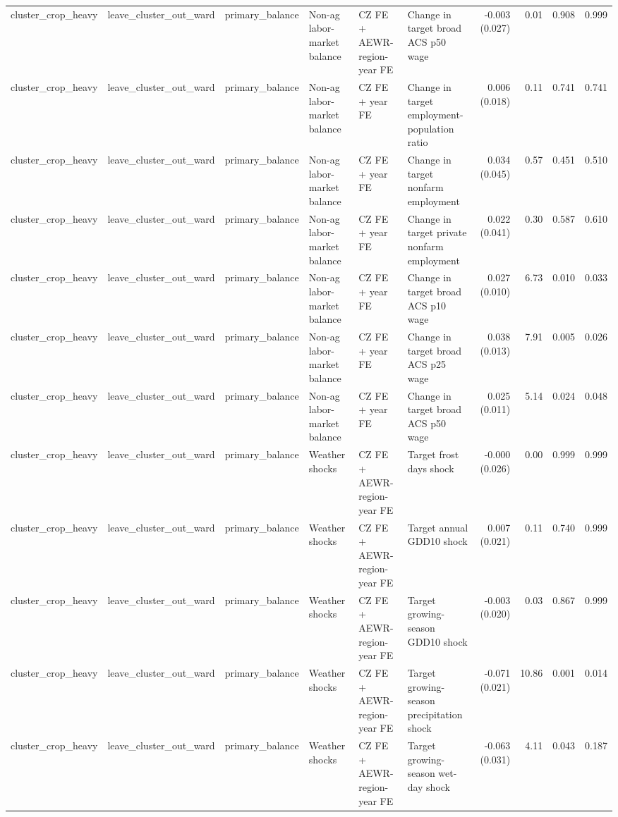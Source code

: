 \begin{tabular}{llllllrrrr}
cluster_crop_heavy & leave_cluster_out_ward & primary_balance & Non-ag labor-market balance & CZ FE + AEWR-region-year FE & Change in target broad ACS p50 wage & -0.003 (0.027) & 0.01 & 0.908 & 0.999 \\
cluster_crop_heavy & leave_cluster_out_ward & primary_balance & Non-ag labor-market balance & CZ FE + year FE & Change in target employment-population ratio & 0.006 (0.018) & 0.11 & 0.741 & 0.741 \\
cluster_crop_heavy & leave_cluster_out_ward & primary_balance & Non-ag labor-market balance & CZ FE + year FE & Change in target nonfarm employment & 0.034 (0.045) & 0.57 & 0.451 & 0.510 \\
cluster_crop_heavy & leave_cluster_out_ward & primary_balance & Non-ag labor-market balance & CZ FE + year FE & Change in target private nonfarm employment & 0.022 (0.041) & 0.30 & 0.587 & 0.610 \\
cluster_crop_heavy & leave_cluster_out_ward & primary_balance & Non-ag labor-market balance & CZ FE + year FE & Change in target broad ACS p10 wage & 0.027 (0.010) & 6.73 & 0.010 & 0.033 \\
cluster_crop_heavy & leave_cluster_out_ward & primary_balance & Non-ag labor-market balance & CZ FE + year FE & Change in target broad ACS p25 wage & 0.038 (0.013) & 7.91 & 0.005 & 0.026 \\
cluster_crop_heavy & leave_cluster_out_ward & primary_balance & Non-ag labor-market balance & CZ FE + year FE & Change in target broad ACS p50 wage & 0.025 (0.011) & 5.14 & 0.024 & 0.048 \\
cluster_crop_heavy & leave_cluster_out_ward & primary_balance & Weather shocks & CZ FE + AEWR-region-year FE & Target frost days shock & -0.000 (0.026) & 0.00 & 0.999 & 0.999 \\
cluster_crop_heavy & leave_cluster_out_ward & primary_balance & Weather shocks & CZ FE + AEWR-region-year FE & Target annual GDD10 shock & 0.007 (0.021) & 0.11 & 0.740 & 0.999 \\
cluster_crop_heavy & leave_cluster_out_ward & primary_balance & Weather shocks & CZ FE + AEWR-region-year FE & Target growing-season GDD10 shock & -0.003 (0.020) & 0.03 & 0.867 & 0.999 \\
cluster_crop_heavy & leave_cluster_out_ward & primary_balance & Weather shocks & CZ FE + AEWR-region-year FE & Target growing-season precipitation shock & -0.071 (0.021) & 10.86 & 0.001 & 0.014 \\
cluster_crop_heavy & leave_cluster_out_ward & primary_balance & Weather shocks & CZ FE + AEWR-region-year FE & Target growing-season wet-day shock & -0.063 (0.031) & 4.11 & 0.043 & 0.187 \\

\end{tabular}
